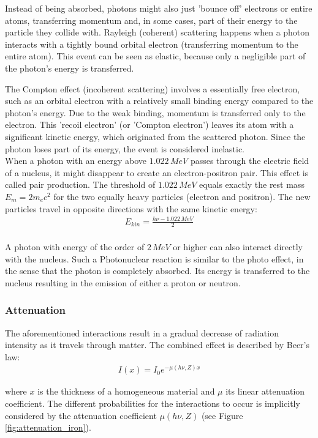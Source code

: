Instead of being absorbed, photons might also just 'bounce off' electrons or entire atoms, transferring momentum and, in some cases, part of their energy to the particle they collide with.
Rayleigh (coherent) scattering happens when a photon interacts with a tightly bound orbital electron (transferring momentum to the entire atom).
This event can be seen as elastic, because only a negligible part of the photon's energy is transferred.

The Compton effect (incoherent scattering) involves a essentially free electron, such as an orbital electron with a relatively small binding energy compared to the photon's energy.
Due to the weak binding, momentum is transferred only to the electron.
This 'recoil electron' (or 'Compton electron') leaves its atom with a significant kinetic energy, which originated from the scattered photon.
Since the photon loses part of its energy, the event is considered inelastic. \\

When a photon with an energy above $1.022 \, MeV$ passes through the electric field of a nucleus, it might disappear to create an electron-positron pair.
This effect is called pair production.
The threshold of $1.022 \, MeV$ equals exactly the rest mass $E_m = 2m_ec^2$ for the two equally heavy particles (electron and positron).
The new particles travel in opposite directions with the same kinetic energy:
\begin{align}
 E_{kin} = \frac{h\nu - 1.022 \, MeV}{2}
\end{align} \\

A photon with energy of the order of $2 \, MeV$ or higher can also interact directly with the nucleus.
Such a Photonuclear reaction is similar to the photo effect, in the sense that the photon is completely absorbed.
Its energy is transferred to the nucleus resulting in the emission of either a proton or neutron.

\subsubsection{Attenuation}
The aforementioned interactions result in a gradual decrease of radiation intensity as it travels through matter.
The combined effect is described by Beer's law:
\begin{align}
I(x) = I_0 e^{-\mu(h\nu,Z)x}
\end{align}

where $x$ is the thickness of a homogeneous material and $\mu$ its linear attenuation coefficient.
The different probabilities for the interactions to occur is implicitly considered by the attenuation coefficient $\mu(h\nu,Z)$ (see Figure \ref{fig:attenuation_iron}).

